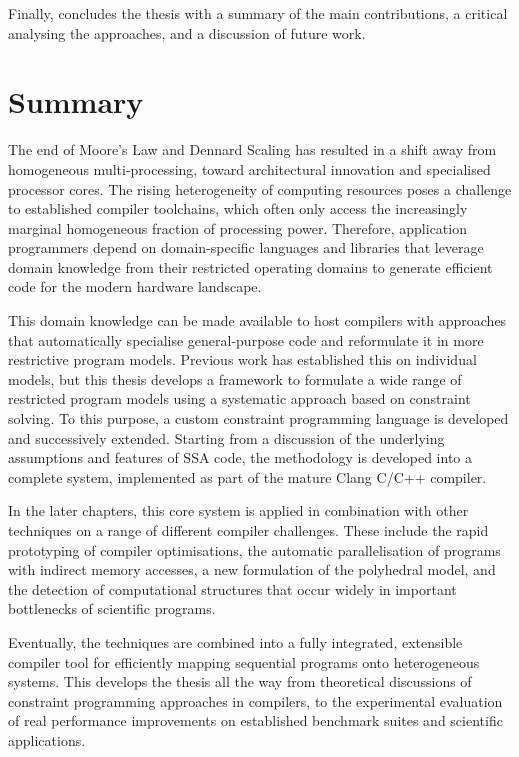     Finally, {\bf{}} concludes the thesis with a summary
    of the main contributions, a critical analysing the approaches, and a
    discussion of future work.

\section{Summary}

    The end of Moore's Law and Dennard Scaling has resulted in a shift away from
    homogeneous multi-processing, toward architectural innovation and
    specialised processor cores.
    The rising heterogeneity of computing resources poses a challenge to
    established compiler toolchains, which often only access the increasingly
    marginal homogeneous fraction of processing power.
    Therefore, application programmers depend on domain-specific languages and
    libraries that leverage domain knowledge from their restricted operating
    domains to generate efficient code for the modern hardware landscape.

    This domain knowledge can be made available to host compilers with
    approaches that automatically specialise general-purpose code and
    reformulate it in more restrictive program models.
    Previous work has established this on individual models, but this thesis
    develops a framework to formulate a wide range of restricted program models
    using a systematic approach based on constraint solving.
    To this purpose, a custom constraint programming language is developed
    and successively extended.
    Starting from a discussion of the underlying assumptions and features of
    SSA code, the methodology is developed into a complete system, implemented
    as part of the mature Clang C/C++ compiler.

    In the later chapters, this core system is applied in combination with other
    techniques on a range of different compiler challenges.
    These include the rapid prototyping of compiler optimisations, the
    automatic parallelisation of programs with indirect memory accesses, a new
    formulation of the polyhedral model, and the detection of computational
    structures that occur widely in important bottlenecks of scientific
    programs.

    Eventually, the techniques are combined into a fully integrated, extensible
    compiler tool for efficiently mapping sequential programs onto heterogeneous
    systems.
    This develops the thesis all the way from theoretical discussions of
    constraint programming approaches in compilers, to the experimental
    evaluation of real performance improvements on established benchmark suites
    and scientific applications.
